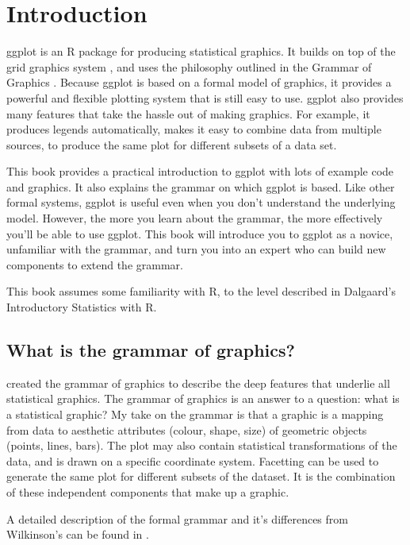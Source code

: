 

\chapter{Introduction}

ggplot is an R package for producing statistical graphics.  It builds on top of the grid graphics system \citep{grid}, and uses the philosophy outlined in the Grammar of Graphics \citep{wilkinson:2006}.  Because ggplot is based on a formal model of graphics, it provides a powerful and flexible plotting system that is still easy to use.  ggplot also provides many features that take the hassle out of making graphics. For example, it produces legends automatically, makes it easy to combine data from multiple sources, to produce the same plot for different subsets of a data set.

This book provides a practical introduction to ggplot with lots of example code and graphics. It also explains the grammar on which ggplot is based. Like other formal systems, ggplot is useful even when you don't understand the underlying model. However, the more you learn about the grammar, the more effectively you'll be able to use ggplot. This book will introduce you to ggplot as a novice, unfamiliar with the grammar, and turn you into an expert who can build new components to extend the grammar.

This book assumes some familiarity with R, to the level described in Dalgaard’s Introductory Statistics with R.

\section{What is the grammar of graphics?}

\citet{wilkinson:2006} created the grammar of graphics to describe the deep features that underlie all statistical graphics.  The grammar of graphics is an answer to a question: what is a statistical graphic?  My take on the grammar is that a graphic is a mapping from data to  aesthetic attributes (colour, shape, size) of geometric objects (points, lines, bars).  The plot may also contain statistical transformations of the data, and is drawn on a specific  coordinate system.  Facetting can be used to generate the same plot for different subsets of the dataset.  It is the combination of these independent components that make up a graphic.  

A detailed description of the formal grammar and it's differences from Wilkinson's can be found in \citet{wickham:2007d}.

